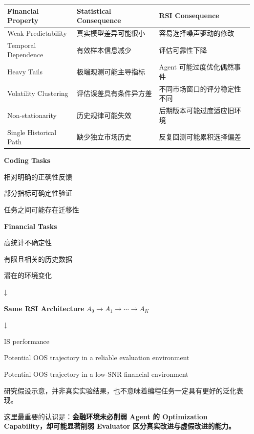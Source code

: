 \begin{readertable}
\begin{longtable}[]{@{}
  >{\raggedright\arraybackslash}p{}
  >{\raggedright\arraybackslash}p{}
  >{\raggedright\arraybackslash}p{}@{}}
\toprule
Financial Property & Statistical Consequence & RSI Consequence \\
\midrule
\endhead
Weak Predictability & 真实模型差异可能很小 & 容易选择噪声驱动的修改 \\
Temporal Dependence & 有效样本信息减少 & 评估可靠性下降 \\
Heavy Tails & 极端观测可能主导指标 & Agent 可能过度优化偶然事件 \\
Volatility Clustering & 评估误差具有条件异方差 & 不同市场窗口的评分稳定性不同 \\
Non-stationarity & 历史规律可能失效 & 后期版本可能过度适应旧环境 \\
Single Historical Path & 缺少独立市场历史 & 反复回测可能累积选择偏差 \\
\bottomrule
\end{longtable}
\end{readertable}

\textbf{Coding Tasks}

相对明确的正确性反馈

部分指标可确定性验证

任务之间可能存在迁移性

\textbf{Financial Tasks}

高统计不确定性

有限且相关的历史数据

潜在的环境变化

↓

\textbf{Same RSI Architecture} \(A_0\rightarrow A_1\rightarrow\cdots\rightarrow A_K\)

↓


IS performance

Potential OOS trajectory in a reliable evaluation environment

Potential OOS trajectory in a low-SNR financial environment

研究假设示意，并非真实实验结果，也不意味着编程任务一定具有更好的泛化表现。

这里最重要的认识是：\textbf{金融环境未必削弱 Agent 的 Optimization Capability，却可能显著削弱 Evaluator 区分真实改进与虚假改进的能力。}

